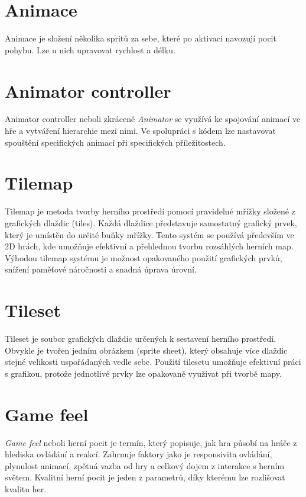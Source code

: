\section{Animace}

Animace je složení několika spritů za sebe, které po aktivaci navozují pocit pohybu. Lze u nich upravovat rychlost a délku.

\section{Animator controller}

Animator controller neboli zkráceně \textit{Animator} se využívá ke spojování animací ve hře a vytváření hierarchie mezi nimi. Ve spolupráci s kódem lze nastavovat spouštění specifických animací při specifických příležitostech.

\section{Tilemap}

Tilemap je metoda tvorby herního prostředí pomocí pravidelné mřížky složené z grafických dlaždic (tiles). Každá dlaždice představuje samostatný grafický prvek, který je umístěn do určité buňky mřížky. Tento systém se používá především ve 2D hrách, kde umožňuje efektivní a přehlednou tvorbu rozsáhlých herních map. Výhodou tilemap systému je možnost opakovaného použití grafických prvků, snížení paměťové náročnosti a snadná úprava úrovní.

\section{Tileset}

Tileset je soubor grafických dlaždic určených k sestavení herního prostředí. Obvykle je tvořen jedním obrázkem (sprite sheet), který obsahuje více dlaždic stejné velikosti uspořádaných vedle sebe. Použití tilesetu umožňuje efektivní práci s grafikou, protože jednotlivé prvky lze opakovaně využívat při tvorbě mapy.

\section{Game feel}

\textit{Game feel} neboli herní pocit je termín, který popisuje, jak hra působí na hráče z hlediska ovládání a reakcí. Zahrnuje faktory jako je responsivita ovládání, plynulost animací, zpětná vazba od hry a celkový dojem z interakce s herním světem. Kvalitní herní pocit je jeden z parametrů, díky kterému lze rozlišovat kvalitu her.

